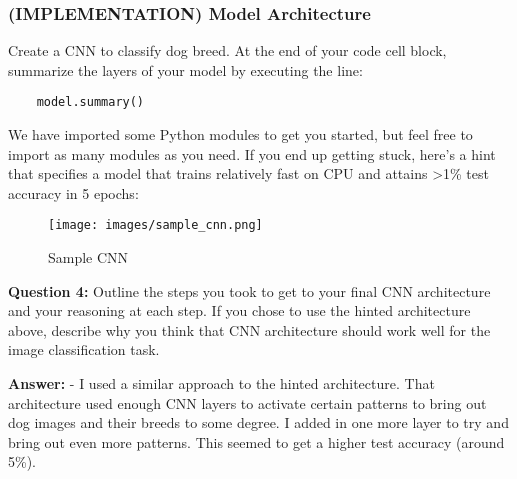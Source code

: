\documentclass[11pt]{article}
\makeatletter
\def\maxwidth{\ifdim\Gin@nat@width>\linewidth\linewidth
    \else\Gin@nat@width\fi}
\let\Oldincludegraphics\includegraphics
\renewcommand{\includegraphics}[1]{\Oldincludegraphics[width=.8\maxwidth]{#1}}
\makeatother
\begin{document}
    \subsubsection{(IMPLEMENTATION) Model
Architecture}\label{implementation-model-architecture}

Create a CNN to classify dog breed. At the end of your code cell block,
summarize the layers of your model by executing the line:

\begin{verbatim}
    model.summary()
\end{verbatim}

We have imported some Python modules to get you started, but feel free
to import as many modules as you need. If you end up getting stuck,
here's a hint that specifies a model that trains relatively fast on CPU
and attains \textgreater{}1\% test accuracy in 5 epochs:

\begin{figure}
\centering
\texttt{[image: images/sample\_cnn.png]}
\caption{Sample CNN}
\end{figure}

\textbf{Question 4:} Outline the steps you took to get to your final CNN
architecture and your reasoning at each step. If you chose to use the
hinted architecture above, describe why you think that CNN architecture
should work well for the image classification task.

\textbf{Answer:} - I used a similar approach to the hinted architecture.
That architecture used enough CNN layers to activate certain patterns to
bring out dog images and their breeds to some degree. I added in one
more layer to try and bring out even more patterns. This seemed to get a
higher test accuracy (around 5\%).
\end{document}
